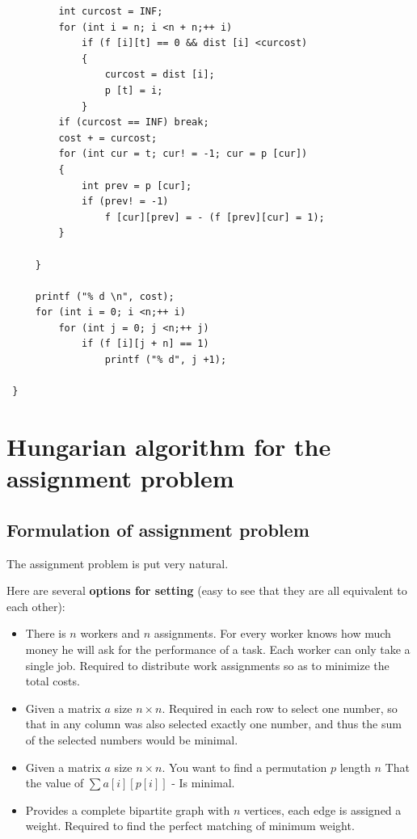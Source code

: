 \begin{verbatim}
         int curcost = INF;
         for (int i = n; i <n + n;++ i)
             if (f [i][t] == ​​0 && dist [i] <curcost)
             {
                 curcost = dist [i];
                 p [t] = i;
             }
         if (curcost == INF) break;
         cost + = curcost;
         for (int cur = t; cur! = -1; cur = p [cur])
         {
             int prev = p [cur];
             if (prev! = -1)
                 f [cur][prev] = - (f [prev][cur] = 1);
         }

     }

     printf ("% d \n", cost);
     for (int i = 0; i <n;++ i)
         for (int j = 0; j <n;++ j)
             if (f [i][j + n] == 1)
                 printf ("% d", j +1);

 } 
\end{verbatim}
\section{ Hungarian algorithm for the assignment problem }
\subsection{ Formulation of assignment problem }

The assignment problem is put very natural.

Here are several \textbf{options for setting} (easy to see that they are all equivalent to each other):

\begin{itemize}

\item There is $n$ workers and $n$ assignments. For every worker knows how much money he will ask for the performance of a task. Each worker can only take a single job. Required to distribute work assignments so as to minimize the total costs.

\item Given a matrix $a$ size $n \times n$. Required in each row to select one number, so that in any column was also selected exactly one number, and thus the sum of the selected numbers would be minimal.

\item Given a matrix $a$ size $n \times n$. You want to find a permutation $p$ length $n$ That the value of $\sum a [i][p [i]]$ - Is minimal.

\item Provides a complete bipartite graph with $n$ vertices, each edge is assigned a weight. Required to find the perfect matching of minimum weight.

\end{itemize}

